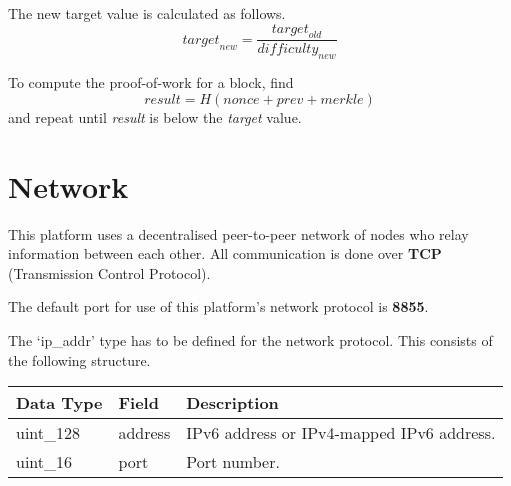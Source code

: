 \documentclass{article}
\begin{document}
The new target value is calculated as follows.
\[\textit{target}_{\textit{new}} = \frac{\textit{target}_{\textit{old}}} {\textit{difficulty}_{\textit{new}}}\]

To compute the proof-of-work for a block, find \[\textit{result} = H(\textit{nonce} + \textit{prev} + \textit{merkle})\] and repeat until \textit{result} is below the \textit{target} value.

\newpage

\section{Network}
This platform uses a decentralised peer-to-peer network of nodes who relay information between each other. All communication is done over \textbf{TCP} (Transmission Control Protocol).

The default port for use of this platform's network protocol is \textbf{8855}.

The `ip\_addr' type has to be defined for the network protocol. This consists of the following structure.
\begin{table}[H]
\centering
\begin{tabular}{|p{2.2cm}|p{3cm}|p{5.5cm}|}
\hline
\rowcolor{tblgrey}
Data Type   & Field       & Description\\ \hline
uint\_128   & address     & IPv6 address or IPv4-mapped IPv6 address.                    \\ \hline
uint\_16    & port        & Port number.                                                 \\ \hline
\end{tabular}
\end{table}
\end{document}
